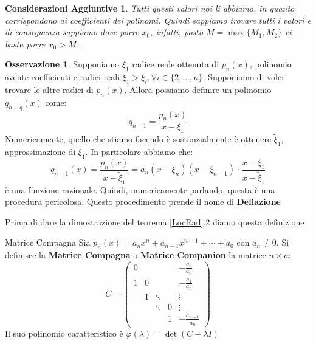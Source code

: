 \documentclass[11pt,a4paper,twoside]{article}
\newtheorem*{cons}{Considerazioni Aggiuntive}
\theoremstyle{definition}
\newtheorem*{oss}{Osservazione}
\begin{document}
\begin{cons}
	Tutti questi valori noi li abbiamo, in quanto corrispondono ai coefficienti dei polinomi. Quindi sappiamo trovare tutti i valori e di conseguenza sappiamo dove porre $x_0$, infatti, posto $M = \max\{M_1, M_2\}$ ci basta porre $x_0 > M$:
	\begin{center}
	\end{center}
\end{cons}

\begin{oss}
	Supponiamo $\xi_1$ radice reale ottenuta di $p_n(x)$, polinomio avente coefficienti e radici reali $\xi_1> \xi_i, \forall i\in \{2,...,n\}$. Supponiamo di voler trovare le altre radici di $p_n(x)$. Allora possiamo definire un polinomio $q_{n-q}(x)$ come:
	\[ q_{n-1}= \frac{p_n(x)}{x-\xi_1} \]
	Numericamente, quello che stiamo facendo è sostanzialmente è ottenere $\tilde \xi_1$, approssimazione di $\xi_1$. In particolare abbiamo che:
	\[ q_{n-1}(x) = \frac{p_n(x)}{x-\tilde \xi_1} = a_n(x-\xi_n)(x-\xi_{n-1})\cdots \frac{x-\xi_1}{x-\tilde\xi_1} \]
	è una funzione razionale. Quindi, numericamente parlando, questa è una procedura pericolosa. Questo procedimento prende il nome di \textbf{Deflazione}
\end{oss}

Prima di dare la dimostrazione del teorema \ref{LocRad}.2 diamo questa definizione

\begin{defn}{Matrice Compagna}{}
	Sia $p_n(x) = a_n x^n + a_{n-1}x^{n-1} + \cdots + a_0$ con $a_n\neq 0$. Si definisce la \textbf{Matrice Compagna} o \textbf{Matrice Companion} la matrice $n \times n$:
	\[ C = \begin{pmatrix}
		0 &&&& -\frac{a_0}{a_n}\\
		1 & 0 &&& -\frac{a_1}{a_n}\\
		& 1 & \ddots && \vdots\\
		&& \ddots & 0 & \vdots\\
		&&& 1 & -\frac{a_{n-1}}{a_n}
	\end{pmatrix}\]
	Il suo polinomio caratteristico è $\varphi(\lambda) = \det (C-\lambda I)$
\end{defn}
\end{document}
